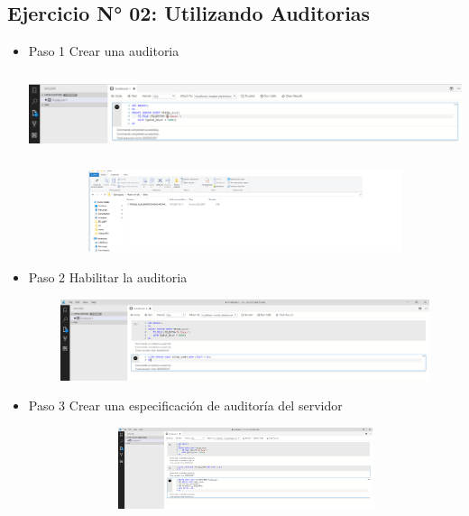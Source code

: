 \subsection{Ejercicio N° 02: Utilizando Auditorias}

			\begin{itemize}  
			
			\item Paso 1 Crear una auditoria
				 
				 	
					\begin{center}
    				\includegraphics[width=16cm, height=90]{./Imagenes/Imagen_11}
   				    \end{center}
   				    
   				    \begin{center}
    				\includegraphics[width=16cm, height=90]{./Imagenes/AuditoriaCreada}
   				    \end{center}
   				    
   		   \item Paso 2 Habilitar la auditoria
				 
				 	
					\begin{center}
    				\includegraphics[width=16cm, height=90]{./Imagenes/Imagen_12}
   				    \end{center}
   				    
   		   \item Paso 3 Crear una especificación de auditoría del servidor
				 
				 	
					\begin{center}
    				\includegraphics[width=16cm, height=90]{./Imagenes/Imagen_13}
   				    \end{center}
   				    

\end{itemize}
